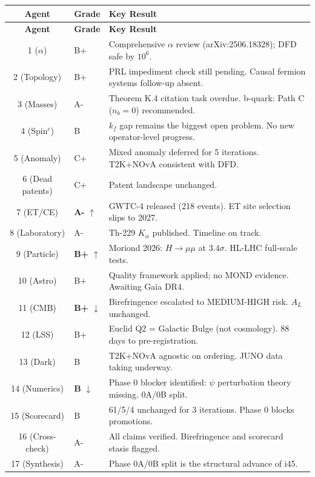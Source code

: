 \documentclass[11pt,a4paper]{article}
\begin{document}
\begin{center}
\begin{longtable}{clp{9cm}}
\toprule
\textbf{Agent} & \textbf{Grade} & \textbf{Key Result} \\
\midrule
\endfirsthead
\toprule
\textbf{Agent} & \textbf{Grade} & \textbf{Key Result} \\
\midrule
\endhead
1 ($\alpha$) & B+ & Comprehensive $\alpha$ review (arXiv:2506.18328); DFD safe by $10^6$. \\
2 (Topology) & B+ & PRL impediment check still pending. Causal fermion systems follow-up absent. \\
3 (Masses) & A- & Theorem K.4 citation task overdue. b-quark: Path C ($n_b = 0$) recommended. \\
4 (Spin$^c$) & B & $k_f$ gap remains the biggest open problem. No new operator-level progress. \\
5 (Anomaly) & C+ & Mixed anomaly deferred for 5 iterations. T2K+NOvA consistent with DFD. \\
6 (Dead patents) & C+ & Patent landscape unchanged. \\
7 (ET/CE) & \textbf{A-} $\uparrow$ & GWTC-4 released (218 events). ET site selection slips to 2027. \\
8 (Laboratory) & A- & Th-229 $K_\alpha$ published. Timeline on track. \\
9 (Particle) & \textbf{B+} $\uparrow$ & Moriond 2026: $H \to \mu\mu$ at $3.4\sigma$. HL-LHC full-scale tests. \\
10 (Astro) & B+ & Quality framework applied; no MOND evidence. Awaiting Gaia DR4. \\
11 (CMB) & \textbf{B+} $\downarrow$ & Birefringence escalated to MEDIUM-HIGH risk. $A_L$ unchanged. \\
12 (LSS) & B+ & Euclid Q2 = Galactic Bulge (not cosmology). 88 days to pre-registration. \\
13 (Dark) & B & T2K+NOvA agnostic on ordering. JUNO data taking underway. \\
14 (Numerics) & \textbf{B} $\downarrow$ & Phase 0 blocker identified: $\psi$ perturbation theory missing. 0A/0B split. \\
15 (Scorecard) & B & 61/5/4 unchanged for 3 iterations. Phase 0 blocks promotions. \\
16 (Cross-check) & A- & All claims verified. Birefringence and scorecard stasis flagged. \\
17 (Synthesis) & A- & Phase 0A/0B split is the structural advance of i45. \\
\bottomrule
\end{longtable}
\end{center}
\end{document}
